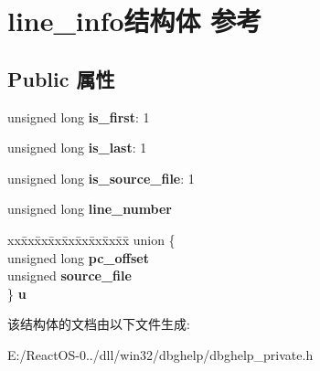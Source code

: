 \hypertarget{structline__info}{}\section{line\+\_\+info结构体 参考}
\label{structline__info}
\subsection*{Public 属性}
\begin{DoxyCompactItemize}
\item 
\mbox{\label{structline__info_a7a8a54e13a82a387f1a053677b6d796b}} 
unsigned long {\bfseries is\+\_\+first}\+: 1
\item 
\mbox{\label{structline__info_a75cf2cb7e00f1e932b26a7ff99831aa1}} 
unsigned long {\bfseries is\+\_\+last}\+: 1
\item 
\mbox{\label{structline__info_aab8b0e5ba239edb107fe176b568d54e3}} 
unsigned long {\bfseries is\+\_\+source\+\_\+file}\+: 1
\item 
\mbox{\label{structline__info_a7c2d04835af9c8952b4b054ded58b32d}} 
unsigned long {\bfseries line\+\_\+number}
\item 
\mbox{\label{structline__info_a4f562bcbce99491589c56560ef3568be}} 
\begin{tabbing}
xx\=xx\=xx\=xx\=xx\=xx\=xx\=xx\=xx\=\kill
union \{\\
\>unsigned long {\bfseries pc\_offset}\\
\>unsigned {\bfseries source\_file}\\
\} {\bfseries u}\\

\end{tabbing}\end{DoxyCompactItemize}


该结构体的文档由以下文件生成\+:\begin{DoxyCompactItemize}
\item 
E\+:/\+React\+O\+S-\/0../dll/win32/dbghelp/dbghelp\+\_\+private.\+h\end{DoxyCompactItemize}
